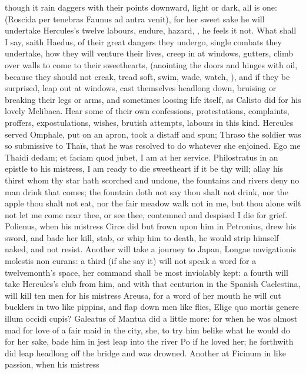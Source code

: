 though it rain daggers with their points downward, light or dark, all
is one: (Roscida per tenebras Faunus ad antra venit), for her sweet
sake he will undertake Hercules's twelve labours, endure, hazard, \etc{},
he feels it not. What shall I say, saith Haedus, of their great
dangers they undergo, single combats they undertake, how they will
venture their lives, creep in at windows, gutters, climb over walls to
come to their sweethearts, (anointing the doors and hinges with oil,
because they should not creak, tread soft, swim, wade, watch, \etc{}), and
if they be surprised, leap out at windows, cast themselves headlong
down, bruising or breaking their legs or arms, and sometimes loosing
life itself, as Calisto did for his lovely Melibaea. Hear some of their
own confessions, protestations, complaints, proffers, expostulations,
wishes, brutish attempts, labours in this kind. Hercules served
Omphale, put on an apron, took a distaff and spun; Thraso the soldier
was so submissive to Thaïs, that he was resolved to do whatever she
enjoined. Ego me Thaidi dedam; et faciam quod jubet, I am at her
service. Philostratus in an epistle to his mistress, I am ready
to die sweetheart if it be thy will; allay his thirst whom thy star
hath scorched and undone, the fountains and rivers deny no man drink
that comes; the fountain doth not say thou shalt not drink, nor the
apple thou shalt not eat, nor the fair meadow walk not in me, but thou
alone wilt not let me come near thee, or see thee, contemned and
despised I die for grief. Polienus, when his mistress Circe did but
frown upon him in Petronius, drew his sword, and bade her kill,
stab, or whip him to death, he would strip himself naked, and not
resist. Another will take a journey to Japan, Longae navigationis
molestis non curans: a third (if she say it) will not speak a word for
a twelvemonth's space, her command shall be most inviolably kept: a
fourth will take Hercules's club from him, and with that centurion in
the Spanish Caelestina, will kill ten men for his mistress
Areusa, for a word of her mouth he will cut bucklers in two like
pippins, and flap down men like flies, Elige quo mortis genere illum
occidi cupis? Galeatus of Mantua did a little more: for when he
was almost mad for love of a fair maid in the city, she, to try him
belike what he would do for her sake, bade him in jest leap into the
river Po if he loved her; he forthwith did leap headlong off the bridge
and was drowned. Another at Ficinum in like passion, when his mistress
